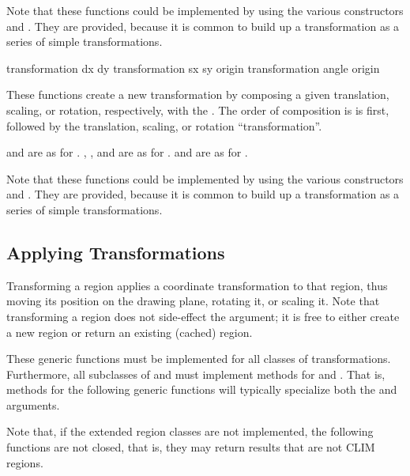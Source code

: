 Note that these functions could be implemented by using the various constructors
and .  They are provided, because it is common to
build up a transformation as a series of simple transformations.


 {transformation dx dy}
     {transformation sx sy \optional origin}
    {transformation angle \optional origin} 

These functions create a new transformation by composing a given translation,
scaling, or rotation, respectively, with the 
.  The order of composition is  is
first, followed by the translation, scaling, or rotation ``transformation''.

 and  are as for .
, , and  are as for .
 and  are as for .

Note that these functions could be implemented by using the various constructors
and .  They are provided, because it is common to
build up a transformation as a series of simple transformations.


\subsection {Applying Transformations}

Transforming a region applies a coordinate transformation to that region, thus
moving its position on the drawing plane, rotating it, or scaling it.  Note that
transforming a region does not side-effect the  argument; it is free
to either create a new region or return an existing (cached) region.

These generic functions must be implemented for all classes of transformations.
Furthermore, all subclasses of  and  must implement
methods for  and .  That is, methods
for the following generic functions will typically specialize both the
 and  arguments.

Note that, if the extended region classes are not implemented, the following
functions are not closed, that is, they may return results that are not CLIM
regions.


